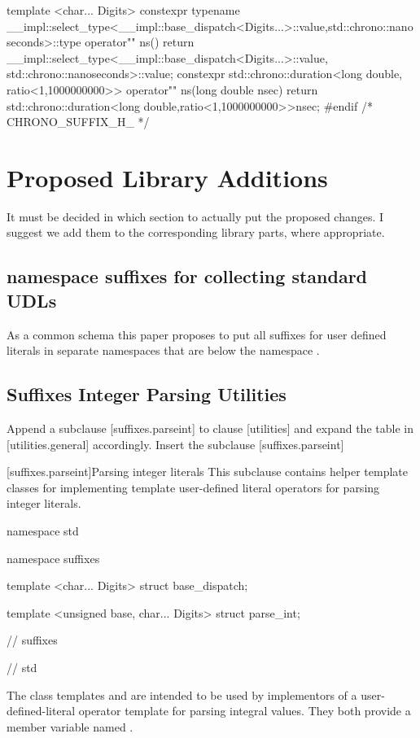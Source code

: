 \documentclass[ebook,11pt,article]{memoir}
\begin{document}
\begin{codeblock}
{{{template <char... Digits>
constexpr typename 
__impl::select_type<__impl::base_dispatch<Digits...>::value,std::chrono::nanoseconds>::type
operator"" ns(){
    return __impl::select_type<__impl::base_dispatch<Digits...>::value,
               std::chrono::nanoseconds>::value;
}
constexpr std::chrono::duration<long double, ratio<1,1000000000>> operator"" ns(long double nsec){
    return std::chrono::duration<long double,ratio<1,1000000000>>{nsec};
}
}
}
}
#endif /* CHRONO_SUFFIX_H_ */
\end{codeblock}



\chapter{Proposed Library Additions}
It must be decided in which section to actually put the proposed changes. I suggest we add them to the corresponding library parts, where appropriate.
\section{namespace suffixes for collecting standard UDLs}
As a common schema this paper proposes to put all suffixes for user defined literals in separate namespaces that are below the namespace . 

\section{Suffixes Integer Parsing Utilities}
Append a subclause [suffixes.parseint] to clause [utilities] and expand the table in [utilities.general] accordingly.
Insert the subclause [suffixes.parseint]

[suffixes.parseint]{Parsing integer literals}
\pnum
This subclause contains helper template classes for implementing template user-defined literal operators for parsing  integer literals.

\begin{codeblock}
namespace std {
namespace suffixes {

template <char... Digits>
struct base_dispatch;

template <unsigned base, char... Digits>
struct parse_int;

} // suffixes
} // std
\end{codeblock}

\pnum
The class templates  and  are intended to be used by implementors of a user-defined-literal operator template for parsing integral values. They both provide a  member variable named . 
\end{document}
